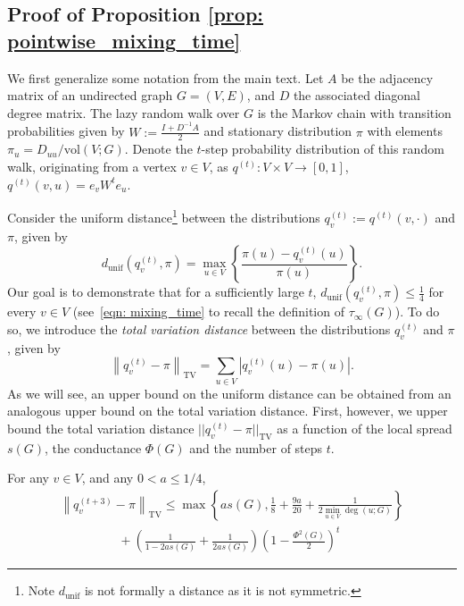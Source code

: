 \documentclass[11pt,twoside]{article}
\newcommand{\set}[1]{\left\{#1\right\}}
\newcommand{\vol}{\mathrm{vol}}
\newcommand{\abs}[1]{\left \lvert #1 \right \rvert}
\newcommand{\norm}[1]{\left\lVert#1\right\rVert}
\newcommand{\1}{\mathbbm{1}}
\newcommand{\Abf}{A}       %
\newcommand{\Wbf}{W}
\newcommand{\Dbf}{D}
\newcommand{\Ibf}[1]{I_{#1}}
\begin{document}
\subsection{Proof of Proposition \ref{prop: pointwise_mixing_time}}
\label{sec: pointwise_mixing_time}

We first generalize some notation from the main text. Let $A$ be the adjacency matrix of an undirected graph $G = (V,E)$, and $D$ the associated diagonal degree matrix. The lazy random walk over $G$ is the Markov chain with transition probabilities given by $\Wbf := \frac{\Ibf{} + \Dbf^{-1} \Abf}{2}$ and stationary distribution $\pi$ with elements $\pi_u = D_{uu}/\vol(V;G)$.  Denote the $t$-step probability distribution of this random walk, originating from a  vertex $v \in V$, as $q^{(t)}: V \times V \to [0,1]$, $q^{(t)}(v,u) = e_v \Wbf^t e_u$.

Consider the uniform distance\footnote{Note $d_{\textrm{unif}}$ is not formally a distance as it is not symmetric.} between the distributions $q_v^{(t)} := q^{(t)}(v,\cdot)$ and $\pi$, given by
\begin{equation*}
d_{\textrm{unif}}(q_v^{(t)},\pi) = \max_{u \in V} \set{\frac{\pi(u) - q_v^{(t)}(u)}{\pi(u)}}.
\end{equation*}
Our goal is to demonstrate that for a sufficiently large $t$, $d_{\textrm{unif}}(q_v^{(t)},\pi) \leq \frac{1}{4}$ for every $v \in V$ (see~\eqref{eqn: mixing_time} to recall the definition of $\tau_{\infty}(G)$). To do so, we introduce the \emph{total variation distance} between the distributions $q_v^{(t)}$ and $\pi$, given by
\begin{equation*}
\norm{q_v^{(t)} - \pi}_{\mathrm{TV}} = \sum_{u \in V} \abs{q_v^{(t)}(u) - \pi(u)}.
\end{equation*}
As we will see, an upper bound on the uniform distance can be obtained from an analogous upper bound on the total variation distance. First, however, we upper bound the total variation distance $||q_v^{(t)} - \pi||_{\mathrm{TV}}$ as a function of the local spread $s(G)$, the conductance $\Phi(G)$ and the number of steps $t$.
\begin{lemma}
	\label{lem: tv_mixing_time}
	For any $v \in V$, and any $0 < a \leq 1/4$,
	\begin{align}
	\norm{q_v^{(t + 3)} - \pi}_{\mathrm{TV}} \leq \max\set{as(G), \frac{1}{8} + \frac{9a}{20} + \frac{1}{2 \min_{u \in V} \deg(u;G)}} 
	\nonumber \\
	~~~~~~~~~~~~~~~~~~~~~ + \left(\frac{1}{1 - 2as(G)} +  \frac{1}{2 as(G)}\right) \left(1 - \frac{\Phi^2(G)}{2}\right)^t \label{eqn: tv_mixing_time}
	\end{align}
\end{lemma}
\end{document}
